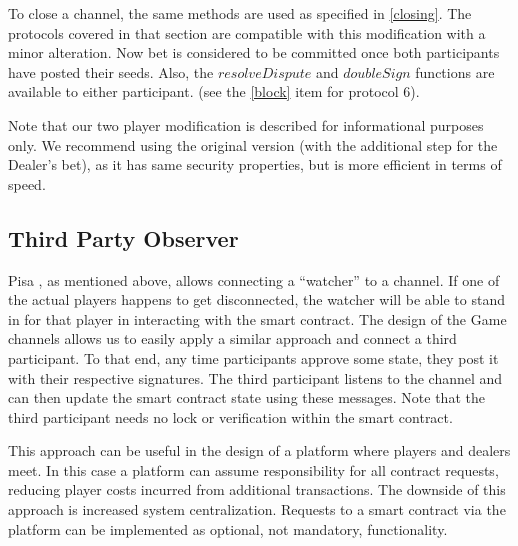 To close a channel, the same methods are used as specified in \autoref{closing}. The protocols covered in that section are compatible with this modification with a minor alteration. Now bet is considered to be committed once both participants have posted their seeds. Also, the  $resolveDispute$ and $doubleSign$ functions are available to either participant. (see the \ref{block} item for protocol 6). 

Note that our two player modification is described for informational purposes only. We recommend using the original version (with the additional step for the Dealer's bet), as it has same security properties, but is more efficient in terms of speed.

\subsection{Third Party Observer}

Pisa \cite{bib9}, as mentioned above, allows connecting a ``watcher'' to a channel. If one of the actual players happens to get disconnected, the watcher will be able to stand in for that player in interacting with the smart contract. The design of the Game channels allows us to easily apply a similar approach and connect a third participant. To that end, any time participants approve some state, they post it with their respective signatures. The third participant listens to the channel and can then update the smart contract state using these messages. Note that the third participant needs no lock or verification within the smart contract. 

This approach can be useful in the design of a platform where players and dealers meet. In this case a platform can assume responsibility for all contract requests, reducing player costs incurred from additional transactions. The downside of this approach is increased system centralization. Requests to a smart contract via the platform can be implemented as optional, not mandatory, functionality.

